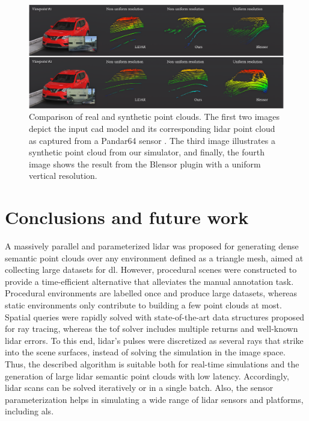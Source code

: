 \begin{figure}
    \centering
    \includegraphics[width=\linewidth]{figs/lidar_simulation/lidar_point_cloud_comparison.png}
	\caption{Comparison of real and synthetic point clouds. The first two images depict the input \acrshort{cad} model and its corresponding \acrshort{lidar} point cloud as captured from a Pandar64 sensor \cite{hesai_pandaset_2021}. The third image illustrates a synthetic point cloud from our simulator, and finally, the fourth image shows the result from the Blensor plugin with a uniform vertical resolution. }
	\label{fig:lidar_point_cloud_comparison}
\end{figure}

\section{Conclusions and future work}

A massively parallel and parameterized \acrshort{lidar} was proposed for generating dense semantic point clouds over any environment defined as a triangle mesh, aimed at collecting large datasets for \acrshort{dl}. However, procedural scenes were constructed to provide a time-efficient alternative that alleviates the manual annotation task. Procedural environments are labelled once and produce large datasets, whereas static environments only contribute to building a few point clouds at most. Spatial queries were rapidly solved with state-of-the-art data structures proposed for ray tracing, whereas the \acrshort{tof} solver includes multiple returns and well-known \acrshort{lidar} errors. To this end, \acrshort{lidar}'s pulses were discretized as several rays that strike into the scene surfaces, instead of solving the simulation in the image space. Thus, the described algorithm is suitable both for real-time simulations and the generation of large \acrshort{lidar} semantic point clouds with low latency. Accordingly, \acrshort{lidar} scans can be solved iteratively or in a single batch. Also, the sensor parameterization helps in simulating a wide range of \acrshort{lidar} sensors and platforms, including \acrshort{als}.

